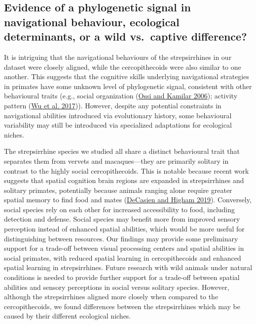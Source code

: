\documentclass[twoside,12pt,final]{ucthesis-CA2012}
\begin{document}
\begin{ucmainmatter}
\hypertarget{evidence-of-a-phylogenetic-signal-in-navigational-behaviour-ecological-determinants-or-a-wild-vs.-captive-difference}{%
\subsection{Evidence of a phylogenetic signal in navigational behaviour, ecological determinants, or a wild vs.~captive difference?}\label{evidence-of-a-phylogenetic-signal-in-navigational-behaviour-ecological-determinants-or-a-wild-vs.-captive-difference}}

It is intriguing that the navigational behaviours of the strepsirrhines in our dataset were closely aligned, while the cercopithecoids were also similar to one another. This suggests that the cognitive skills underlying navigational strategies in primates have some unknown level of phylogenetic signal, consistent with other behavioural traits (e.g., social organization (\protect\hyperlink{ref-ossi2006}{Ossi and Kamilar 2006}); activity pattern (\protect\hyperlink{ref-wu2017}{Wu et al. 2017})). However, despite any potential constraints in navigational abilities introduced via evolutionary history, some behavioural variability may still be introduced via specialized adaptations for ecological niches.

The strepsirrhine species we studied all share a distinct behavioural trait that separates them from vervets and macaques---they are primarily solitary in contrast to the highly social cercopithecoids. This is notable because recent work suggests that spatial cognition brain regions are expanded in strepsirrhines and solitary primates, potentially because animals ranging alone require greater spatial memory to find food and mates (\protect\hyperlink{ref-decasien2019}{DeCasien and Higham 2019}). Conversely, social species rely on each other for increased accessibility to food, including detection and defense. Social species may benefit more from improved sensory perception instead of enhanced spatial abilities, which would be more useful for distinguishing between resources. Our findings may provide some preliminary support for a trade-off between visual processing centers and spatial abilities in social primates, with reduced spatial learning in cercopithecoids and enhanced spatial learning in strepsirrhines. Future research with wild animals under natural conditions is needed to provide further support for a trade-off between spatial abilities and sensory perceptions in social versus solitary species. However, although the strepsirrhines aligned more closely when compared to the cercopithecoids, we found differences between the strepsirrhines which may be caused by their different ecological niches.


\end{ucmainmatter}
\end{document}
